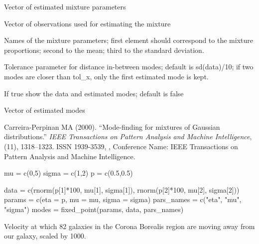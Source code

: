 \documentclass[a4paper]{book}
\begin{document}
%
\begin{Arguments}
\begin{ldescription}
\item[\code{mcmc}] Vector of estimated mixture parameters

\item[\code{data}] Vector of observations used for estimating the mixture

\item[\code{pars\_names}] Names of the mixture parameters; first element should 
correspond to the mixture proportions; second to the mean; third to the 
standard deviation.

\item[\code{tol\_x}] Tolerance parameter for distance in-between modes; default is sd(data)/10; if two modes are closer than tol\_x, only the first estimated mode is kept.

\item[\code{show\_plot}] If true show the data and estimated modes; default is false
\end{ldescription}
\end{Arguments}
%
\begin{Value}
Vector of estimated modes
\end{Value}
%
\begin{References}\relax
Carreira-Perpinan MA (2000).
``Mode-finding for mixtures of Gaussian distributions.''
\emph{IEEE Transactions on Pattern Analysis and Machine Intelligence}, (11), 1318--1323.
ISSN 1939-3539, , Conference Name: IEEE Transactions on Pattern Analysis and Machine Intelligence.
\end{References}
%
\begin{Examples}
\begin{ExampleCode}
mu = c(0,5)
sigma = c(1,2)
p = c(0.5,0.5)

data = c(rnorm(p[1]*100, mu[1], sigma[1]), rnorm(p[2]*100, mu[2], sigma[2]))
params = c(eta = p, mu = mu, sigma = sigma)
pars_names = c("eta", "mu", "sigma")
modes = fixed_point(params, data, pars_names)

\end{ExampleCode}
\end{Examples}
%
\begin{Description}\relax
Velocity at which 82 galaxies in the Corona Borealis region are moving away from our galaxy, scaled by 1000.
\end{Description}
\end{document}
